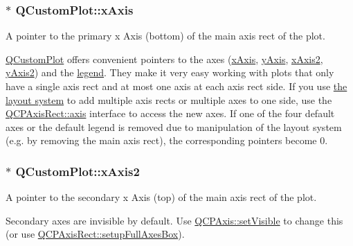 \subsubsection[{x\+Axis}]{ $\ast$ Q\+Custom\+Plot\+::x\+Axis}\label{classQCustomPlot_a9a79cd0158a4c7f30cbc702f0fd800e4}


A pointer to the primary x Axis (bottom) of the main axis rect of the plot. 

\hyperlink{classQCustomPlot}{Q\+Custom\+Plot} offers convenient pointers to the axes (\hyperlink{classQCustomPlot_a9a79cd0158a4c7f30cbc702f0fd800e4}{x\+Axis}, \hyperlink{classQCustomPlot_af6fea5679725b152c14facd920b19367}{y\+Axis}, \hyperlink{classQCustomPlot_ada41599f22cad901c030f3dcbdd82fd9}{x\+Axis2}, \hyperlink{classQCustomPlot_af13fdc5bce7d0fabd640f13ba805c0b7}{y\+Axis2}) and the \hyperlink{classQCustomPlot_a4eadcd237dc6a09938b68b16877fa6af}{legend}. They make it very easy working with plots that only have a single axis rect and at most one axis at each axis rect side. If you use \hyperlink{}{the layout system} to add multiple axis rects or multiple axes to one side, use the \hyperlink{classQCPAxisRect_a560de44e47a4af0f86c59102a094b1e4}{Q\+C\+P\+Axis\+Rect\+::axis} interface to access the new axes. If one of the four default axes or the default legend is removed due to manipulation of the layout system (e.\+g. by removing the main axis rect), the corresponding pointers become 0. \hypertarget{classQCustomPlot_ada41599f22cad901c030f3dcbdd82fd9}{}
\subsubsection[{x\+Axis2}]{ $\ast$ Q\+Custom\+Plot\+::x\+Axis2}\label{classQCustomPlot_ada41599f22cad901c030f3dcbdd82fd9}


A pointer to the secondary x Axis (top) of the main axis rect of the plot. 

Secondary axes are invisible by default. Use \hyperlink{classQCPLayerable_a3bed99ddc396b48ce3ebfdc0418744f8}{Q\+C\+P\+Axis\+::set\+Visible} to change this (or use \hyperlink{classQCPAxisRect_a5fa906175447b14206954f77fc7f1ef4}{Q\+C\+P\+Axis\+Rect\+::setup\+Full\+Axes\+Box}).

